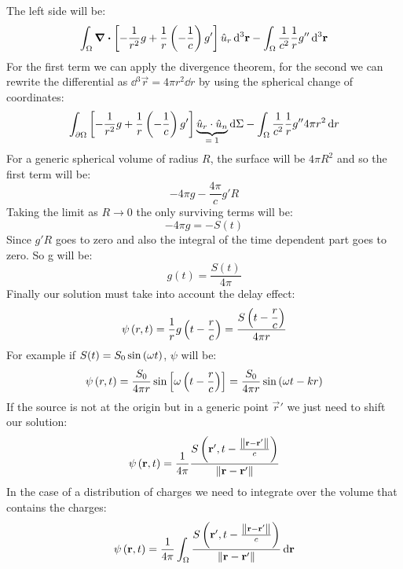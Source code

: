 The left side will be:
\begin{equation}
  \int_{\Omega} \div{\left[-\dfrac{1}{r^2}g + \dfrac{1}{r}\left(- \dfrac{1}{c}\right)g'\right]}\hat{u}_r \dd{^3\vb{r}} - \int_{\Omega}\dfrac{1}{c^2}\dfrac{1}{r}g''\dd{^3\vb{r}}
\end{equation}
For the first term we can apply the divergence theorem, for the second we can rewrite the differential as $\dd{^3\vec{r}} = 4\pi r^2 \dd{r}$ by using the spherical change of coordinates:
\begin{equation}
  \int_{\partial \Omega} \left[-\dfrac{1}{r^2}g + \dfrac{1}{r}\left(- \dfrac{1}{c}\right)g'\right] \underbrace{\hat{u}_r \cdot \hat{u}_n}_{=\;1} \dd{\Sigma} - \int_{\Omega}\dfrac{1}{c^2}\dfrac{1}{r}g''4\pi r^2 \dd{r}
\end{equation}
For a generic spherical volume of radius $R$, the surface will be $4\pi R^2$ and so the first term will be:
\begin{equation}
  -4\pi g - \dfrac{4 \pi}{c}g'R
\end{equation}
Taking the limit as $R \rightarrow 0$ the only surviving terms will be:
\begin{equation}
  -4\pi g = -S(t)
\end{equation}
Since $g'R$ goes to zero and also the integral of the time dependent part goes to zero. So g will be:
\begin{equation}
  g(t) = \dfrac{S(t)}{4\pi}
\end{equation}
Finally our solution must take into account the delay effect:
\begin{equation}
  \psi\left(r,t\right) = \dfrac{1}{r}g\left(t-\dfrac{r}{c}\right)= \dfrac{S\left(t-\dfrac{r}{c}\right)}{4\pi r}
\end{equation}
For example if $S(t) = S_0\sin\left(\omega t\right)$, $\psi$ will be:
\begin{equation}
  \psi\left(r,t\right) = \dfrac{S_0}{4\pi r}\sin \left[\omega\left(t-\dfrac{r}{c}\right)\right] = \dfrac{S_0}{4\pi r}\sin \left(\omega t- kr\right)
\end{equation}
If the source is not at the origin but in a generic point $\vec{r}'$ we just need to shift our solution:
\begin{equation}
  \psi\left(\vb{r},t\right) = \dfrac{1}{4\pi}\dfrac{S\left(\vb{r}', t-\frac{\norm{\vb{r}-\vb{r}'}}{c}\right)}{\norm{\vb{r}-\vb{r}'}}
\end{equation}
In the case of a distribution of charges we need to integrate over the volume that contains the charges:
\begin{equation}
  \psi\left(\vb{r},t\right) = \dfrac{1}{4\pi}\int_{\Omega }\dfrac{S\left(\vb{r}', t-\frac{\norm{\vb{r}-\vb{r}'}}{c}\right)}{ \norm{\vb{r}-\vb{r}'}} \dd{\vb{r}}
\end{equation}
